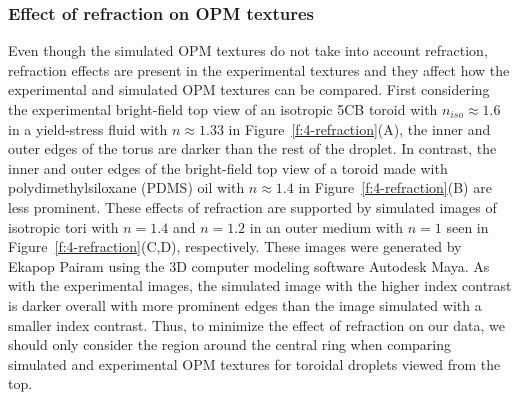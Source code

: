 \subsubsection{Effect of refraction on OPM textures}
Even though the simulated OPM textures do not take into account refraction, refraction effects are present in the experimental textures and they affect how the experimental and simulated OPM textures can be compared.
First considering the experimental bright-field top view of an isotropic 5CB toroid with $n_{iso} \approx 1.6 $ in a yield-stress fluid with $n \approx 1.33$ in Figure~\ref{f:4-refraction}(A), the inner and outer edges of the torus are darker than the rest of the droplet.
In contrast, the inner and outer edges of the bright-field top view of a toroid made with polydimethylsiloxane (PDMS) oil with $n \approx 1.4$ in Figure~\ref{f:4-refraction}(B) are less prominent.
These effects of refraction are supported by simulated images of isotropic tori with $n = 1.4$ and $n = 1.2$ in an outer medium with $n=1$ seen in Figure~\ref{f:4-refraction}(C,D), respectively.
These images were generated by Ekapop Pairam using the 3D computer modeling software Autodesk Maya.
As with the experimental images, the simulated image with the higher index contrast is darker overall with more prominent edges than the image simulated with a smaller index contrast.
Thus, to minimize the effect of refraction on our data, we should only consider the region around the central ring when comparing simulated and experimental OPM textures for toroidal droplets viewed from the top.

